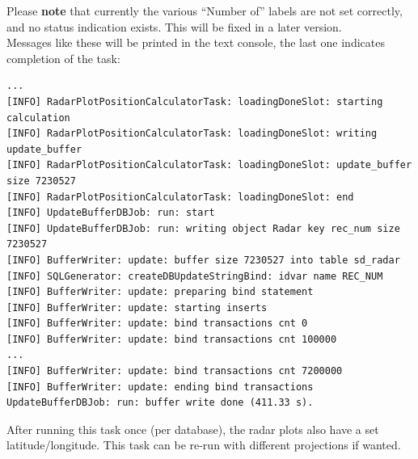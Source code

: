 Please \textbf{note} that currently the various ``Number of'' labels are not set correctly, and no status indication exists. This will be fixed in a later version. \\

Messages like these will be printed in the text console, the last one indicates completion of the task:

\begin{verbatim}
...
[INFO] RadarPlotPositionCalculatorTask: loadingDoneSlot: starting calculation
[INFO] RadarPlotPositionCalculatorTask: loadingDoneSlot: writing update_buffer
[INFO] RadarPlotPositionCalculatorTask: loadingDoneSlot: update_buffer size 7230527
[INFO] RadarPlotPositionCalculatorTask: loadingDoneSlot: end
[INFO] UpdateBufferDBJob: run: start
[INFO] UpdateBufferDBJob: run: writing object Radar key rec_num size 7230527
[INFO] BufferWriter: update: buffer size 7230527 into table sd_radar
[INFO] SQLGenerator: createDBUpdateStringBind: idvar name REC_NUM
[INFO] BufferWriter: update: preparing bind statement
[INFO] BufferWriter: update: starting inserts
[INFO] BufferWriter: update: bind transactions cnt 0
[INFO] BufferWriter: update: bind transactions cnt 100000
...
[INFO] BufferWriter: update: bind transactions cnt 7200000
[INFO] BufferWriter: update: ending bind transactions
UpdateBufferDBJob: run: buffer write done (411.33 s).
\end{verbatim}

After running this task once (per database), the radar plots also have a set latitude/longitude. This task can be re-run with different projections if wanted.
 
